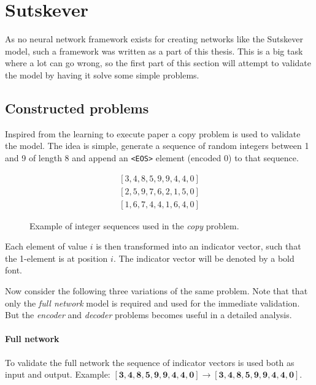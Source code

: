\section{Sutskever}

As no neural network framework exists for creating networks like the Sutskever model, such a framework was written as a part of this thesis. This is a big task where a lot can go wrong, so the first part of this section will attempt to validate the model by having it solve some simple problems.

\subsection{Constructed problems}

Inspired from the learning to execute paper \cite{learning-to-execute} a copy problem is used to validate the model. The idea is simple, generate a sequence of random integers between 1 and 9 of length 8 and append an \texttt{<EOS>} element (encoded 0) to that sequence. 
\begin{figure}[H]
\begin{equation*}
\begin{aligned}
[3, 4, 8, 5, 9, 9, 4, 4, 0] \\
[2, 5, 9, 7, 6, 2, 1, 5, 0] \\
[1, 6, 7, 4, 4, 1, 6, 4, 0]
\end{aligned}
\end{equation*}
\caption{Example of integer sequences used in the \textit{copy} problem.}
\end{figure}

Each element of value $i$ is then transformed into an indicator vector, such that the 1-element is at position $i$. The indicator vector will be denoted by a bold font.

Now consider the following three variations of the same problem. Note that that only the \textit{full network} model is required and used for the immediate validation. But the \textit{encoder} and \textit{decoder} problems becomes useful in a detailed analysis.

\paragraph{Full network} To validate the full network the sequence of indicator vectors is used both as input and output. Example: $[\mathbf{3}, \mathbf{4}, \mathbf{8}, \mathbf{5}, \mathbf{9}, \mathbf{9}, \mathbf{4}, \mathbf{4}, \mathbf{0}] \rightarrow [\mathbf{3}, \mathbf{4}, \mathbf{8}, \mathbf{5}, \mathbf{9}, \mathbf{9}, \mathbf{4}, \mathbf{4}, \mathbf{0}]$.

